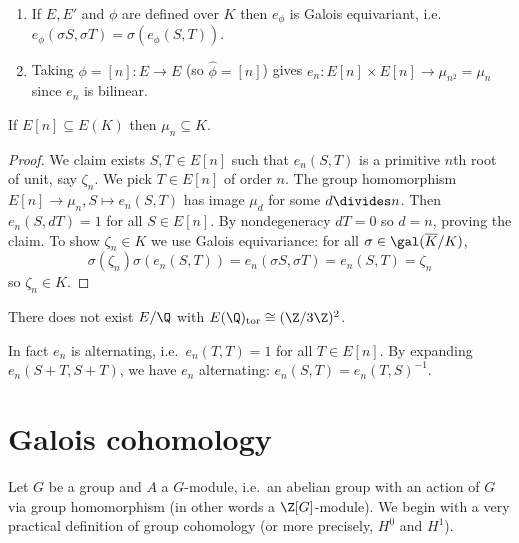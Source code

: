 \documentclass[a4paper]{article}
\theoremstyle{definition}
\begin{document}
\begin{remark}\leavevmode
  \begin{enumerate}
  \item If \(E, E'\) and \(\phi\) are defined over \(K\) then \(e_\phi\) is Galois equivariant, i.e.\ \(e_\phi(\sigma S, \sigma T) = \sigma(e_\phi(S, T))\).
  \item Taking \(\phi = [n]: E \to E\) (so \(\hat \phi = [n]\)) gives \(e_n: E[n] \times E[n] \to \mu_{n^2} = \mu_n\) since \(e_n\) is bilinear.
  \end{enumerate}
\end{remark}

\begin{corollary}
  If \(E[n] \subseteq E(K)\) then \(\mu_n \subseteq K\).
\end{corollary}

\begin{proof}
  We claim exists \(S, T \in E[n]\) such that \(e_n(S, T)\) is a primitive \(n\)th root of unit, say \(\zeta_n\). We pick \(T \in E[n]\) of order \(n\). The group homomorphism \(E[n] \to \mu_n, S \mapsto e_n(S, T)\) has image \(\mu_d\) for some \(d \divides n\). Then \(e_n(S, dT) = 1\) for all \(S \in E[n]\). By nondegeneracy \(dT = 0\) so \(d = n\), proving the claim. To show \(\zeta_n \in K\) we use Galois equivariance: for all \(\sigma \in \gal(\overline K/K)\),
  \[
    \sigma(\zeta_n) \sigma(e_n(S, T)) = e_n(\sigma S, \sigma T) = e_n(S, T) = \zeta_n
  \]
  so \(\zeta_n \in K\).
\end{proof}

\begin{eg}
  There does not exist \(E/\Q\) with \(E(\Q)_{\mathrm{tor}} \cong (\Z/3\Z)^2\).
\end{eg}

\begin{remark}
  In fact \(e_n\) is alternating, i.e.\ \(e_n(T, T) = 1\) for all \(T \in E[n]\). By expanding \(e_n(S + T, S + T)\), we have \(e_n\) alternating: \(e_n(S, T) = e_n(T, S)^{-1}\).
\end{remark}

\section{Galois cohomology}

Let \(G\) be a group and \(A\) a \(G\)-module, i.e.\ an abelian group with an action of \(G\) via group homomorphism (in other words a \(\Z[G]\)-module). We begin with a very practical definition of group cohomology (or more precisely, \(H^0\) and \(H^1\)).
\end{document}
